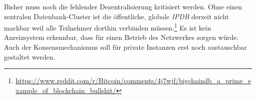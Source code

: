 Bisher muss noch die fehlender Dezentralisierung kritisiert werden.
Ohne einen zentralen Datenbank-Cluster ist die öffentliche, globale \emph{IPDB} derzeit nicht machbar weil alle Teilnehmer dorthin verbinden müssen.\footnote{\url{https://www.reddit.com/r/Bitcoin/comments/4j7wjf/bigchaindb_a_prime_example_of_blockchain_bullshit/}}
Es ist kein Anreizsystem erkennbar, dass für einen Betrieb des Netzwerkes sorgen würde.
Auch der Konsensmechanismus soll für private Instanzen erst noch austauschbar gestaltet werden.







